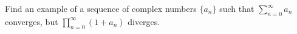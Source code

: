 Find an example of a sequence of complex numbers $\{a_n\}$ such that $\sum\limits_{n=0}^{\infty} a_n$ converges, but 
\linebreak $\prod\limits_{n=0}^{\infty} (1 + a_n)$ diverges.

\begin{solution}
  \ \\
\end{solution}